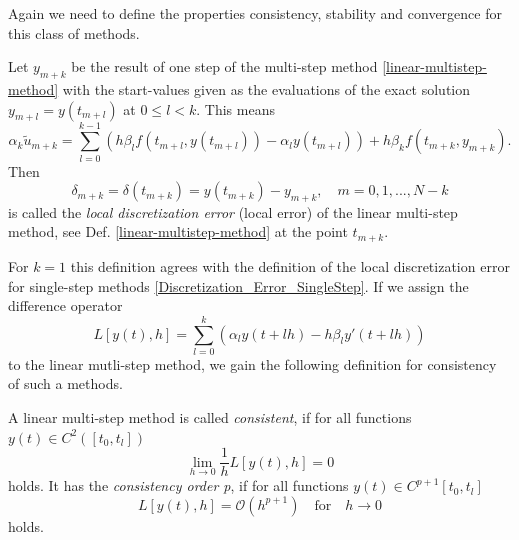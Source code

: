 	Again we need to define the properties consistency, stability and convergence for this class of methods.
	\begin{definition}
		Let $y_{m+k}$ be the result of one step of the multi-step method \eqref{linear-multistep-method} with the start-values given as the evaluations of the exact solution $y_{m+l} = y(t_{m+l})$ at $0 \leq l < k$. This means
		\begin{displaymath}
			\alpha_k \tilde{u}_{m+k} = \sum_{l=0}^{k-1} \left( h \beta_l f(t_{m+l}, y(t_{m+l})) - \alpha_l y(t_{m+l}) \right) + h \beta_k f(t_{m+k}, y_{m+k}) .
		\end{displaymath}
		Then
		\begin{displaymath}
			\delta_{m+k} = \delta(t_{m+k}) = y(t_{m+k}) - y_{m+k}, \quad m=0,1,...,N-k
		\end{displaymath}
		is called the \emph{local discretization error} (local error) of the linear multi-step method, see Def. \ref{linear-multistep-method} at the point $t_{m+k}$.
	\end{definition}
	
	For $k=1$ this definition agrees with the definition of the local discretization error for single-step methods \ref{Discretization_Error_SingleStep}.
	If we assign the difference operator
	\begin{equation}
		L[y(t),h] = \sum_{l=0}^{k} \left( \alpha_l y(t+lh) - h \beta_l y'(t+lh) \right)
	\end{equation}
	to the linear mutli-step method, we gain the following definition for consistency of such a methods.
	
	\begin{definition}
		A linear multi-step method is called %
		\emph{consistent}, if for all functions $y(t) \in C^2([t_0,t_l])$
		\begin{displaymath}
			\lim\limits_{h \to 0} \frac{1}{h} L[y(t),h] = 0
		\end{displaymath}
		holds. It has the \emph{consistency order p}, if for all functions $y(t) \in C^{p+1}[t_0, t_l]$
		\begin{displaymath}
			L[y(t),h] = \mathcal{O}(h^{p+1}) \quad \text{for} \quad h \to 0
		\end{displaymath}
		holds.
	\end{definition}

